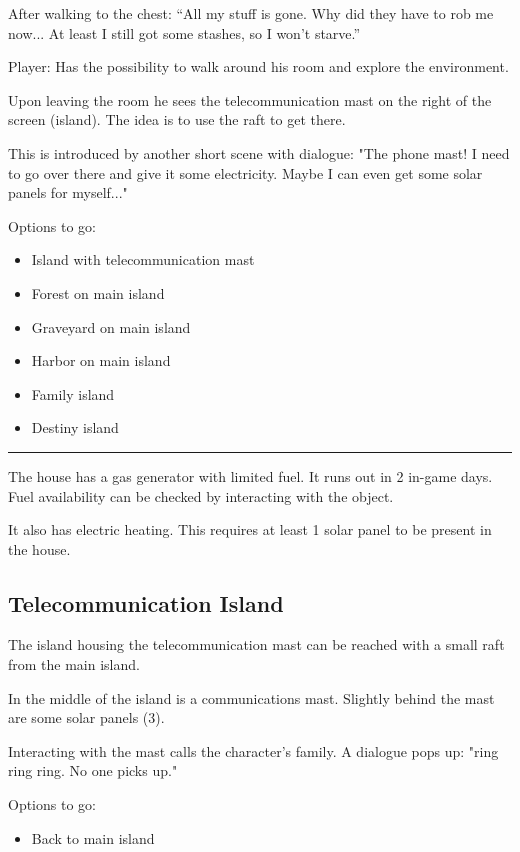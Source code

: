 \documentclass[a4paper]{scrreprt}
\begin{document}
After walking to the chest: ``All my stuff is gone. Why did they have to rob me now... At least I still got some stashes, so I won't starve.''

Player: Has the possibility to walk around his room and explore the environment.

Upon leaving the room he sees the telecommunication mast on the right of the screen (island). The idea is to use the raft to get there.

This is introduced by another short scene with dialogue: "The phone mast! I need to go over there and give it some electricity. Maybe I can even get some solar panels for myself..."

Options to go:
\begin{itemize}
    \item Island with telecommunication mast
    \item Forest on main island
    \item Graveyard on main island
    \item Harbor on main island
    \item Family island
    \item Destiny island
\end{itemize}

\rule{\textwidth}{0.1pt}

The house has a gas generator with limited fuel. It runs out in 2 in-game days.
Fuel availability can be checked by interacting with the object.

It also has electric heating. This requires at least 1 solar panel to be present in the house.


\subsection{Telecommunication Island}

The island housing the telecommunication mast can be reached with a small raft from the main island.

In the middle of the island is a communications mast.
Slightly behind the mast are some solar panels (3).

Interacting with the mast calls the character's family. A dialogue pops up: "ring ring ring. No one picks up."

Options to go:
\begin{itemize}
    \item Back to main island
\end{itemize}
\end{document}

